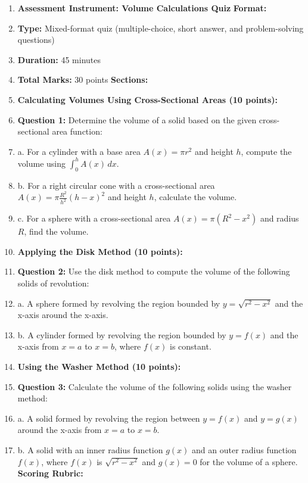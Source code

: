 \begin{enumerate}
    \item \textbf{Assessment Instrument: Volume Calculations Quiz} \textbf{Format:}
    \item \textbf{Type:} Mixed-format quiz (multiple-choice, short answer, and problem-solving questions)
    \item \textbf{Duration:} 45 minutes
    \item \textbf{Total Marks:} 30 points \textbf{Sections:}
    \item \textbf{Calculating Volumes Using Cross-Sectional Areas (10 points):}
    \item \textbf{Question 1:} Determine the volume of a solid based on the given cross-sectional area function:
    \item a. For a cylinder with a base area \( A(x) = \pi r^2 \) and height \( h \), compute the volume using \( \int_0^h A(x) \, dx \).
    \item b. For a right circular cone with a cross-sectional area \( A(x) = \pi \frac{R^2}{h^2} (h - x)^2 \) and height \( h \), calculate the volume.
    \item c. For a sphere with a cross-sectional area \( A(x) = \pi (R^2 - x^2) \) and radius \( R \), find the volume.
    \item \textbf{Applying the Disk Method (10 points):}
    \item \textbf{Question 2:} Use the disk method to compute the volume of the following solids of revolution:
    \item a. A sphere formed by revolving the region bounded by \( y = \sqrt{r^2 - x^2} \) and the x-axis around the x-axis.
    \item b. A cylinder formed by revolving the region bounded by \( y = f(x) \) and the x-axis from \( x = a \) to \( x = b \), where \( f(x) \) is constant.
    \item \textbf{Using the Washer Method (10 points):}
    \item \textbf{Question 3:} Calculate the volume of the following solids using the washer method:
    \item a. A solid formed by revolving the region between \( y = f(x) \) and \( y = g(x) \) around the x-axis from \( x = a \) to \( x = b \).
    \item b. A solid with an inner radius function \( g(x) \) and an outer radius function \( f(x) \), where \( f(x) \) is \( \sqrt{r^2 - x^2} \) and \( g(x) = 0 \) for the volume of a sphere. \textbf{Scoring Rubric:}

\end{enumerate}
